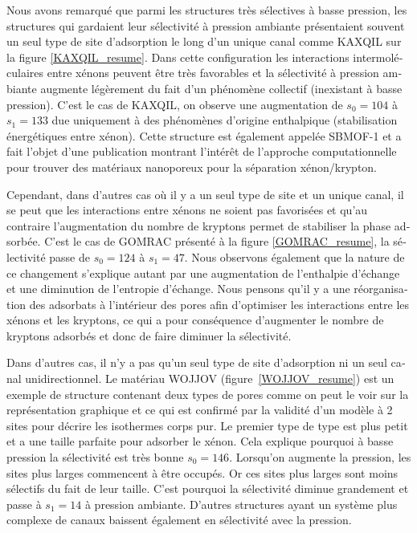 \documentclass[thesis]{subfiles}
\begin{document}
\begin{otherlanguage}{french}
Nous avons remarqué que parmi les structures très sélectives à basse pression, les structures qui gardaient leur sélectivité à pression ambiante présentaient souvent un seul type de site d'adsorption le long d'un unique canal comme KAXQIL sur la figure \ref{KAXQIL_resume}. Dans cette configuration les interactions intermoléculaires entre xénons peuvent être très favorables et la sélectivité à pression ambiante augmente légèrement du fait d'un phénomène collectif (inexistant à basse pression). C'est le cas de KAXQIL, on observe une augmentation de $s_0=104$ à $s_1=133$ due uniquement à des phénomènes d'origine enthalpique (stabilisation énergétiques entre xénon). Cette structure est également appelée SBMOF-1 et a fait l'objet d'une publication montrant l'intérêt de l'approche computationnelle pour trouver des matériaux nanoporeux pour la séparation xénon/krypton.

Cependant, dans d'autres cas où il y a un seul type de site et un unique canal, il se peut que les interactions entre xénons ne soient pas favorisées et qu'au contraire l'augmentation du nombre de kryptons permet de stabiliser la phase adsorbée. C'est le cas de GOMRAC présenté à la figure \ref{GOMRAC_resume}, la sélectivité passe de $s_0=124$ à $s_1=47$. Nous observons également que la nature de ce changement s'explique autant par une augmentation de l'enthalpie d'échange et une diminution de l'entropie d'échange. Nous pensons qu'il y a une réorganisation des adsorbats à l'intérieur des pores afin d'optimiser les interactions entre les xénons et les kryptons, ce qui a pour conséquence d'augmenter le nombre de kryptons adsorbés et donc de faire diminuer la sélectivité.

Dans d'autres cas, il n'y a pas qu'un seul type de site d'adsorption ni un seul canal unidirectionnel. Le matériau WOJJOV (figure~\ref{WOJJOV_resume}) est un exemple de structure contenant deux types de pores comme on peut le voir sur la représentation graphique et ce qui est confirmé par la validité d'un modèle à 2 sites pour décrire les isothermes corps pur. Le premier type de type est plus petit et a une taille parfaite pour adsorber le xénon. Cela explique pourquoi à basse pression la sélectivité est très bonne $s_0=146$. Lorsqu'on augmente la pression, les sites plus larges commencent à être occupés. Or ces sites plus larges sont moins sélectifs du fait de leur taille. C'est pourquoi la sélectivité diminue grandement et passe à $s_1=14$ à pression ambiante. D'autres structures ayant un système plus complexe de canaux baissent également en sélectivité avec la pression.


\end{otherlanguage}
\end{document}
